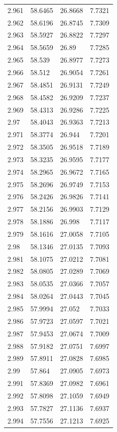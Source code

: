 \begin{tabular}{llll}
2.961 & 58.6465 & 26.8668 & 7.7321 \\
2.962 & 58.6196 & 26.8745 & 7.7309 \\
2.963 & 58.5927 & 26.8822 & 7.7297 \\
2.964 & 58.5659 & 26.89 & 7.7285 \\
2.965 & 58.539 & 26.8977 & 7.7273 \\
2.966 & 58.512 & 26.9054 & 7.7261 \\
2.967 & 58.4851 & 26.9131 & 7.7249 \\
2.968 & 58.4582 & 26.9209 & 7.7237 \\
2.969 & 58.4313 & 26.9286 & 7.7225 \\
2.97 & 58.4043 & 26.9363 & 7.7213 \\
2.971 & 58.3774 & 26.944 & 7.7201 \\
2.972 & 58.3505 & 26.9518 & 7.7189 \\
2.973 & 58.3235 & 26.9595 & 7.7177 \\
2.974 & 58.2965 & 26.9672 & 7.7165 \\
2.975 & 58.2696 & 26.9749 & 7.7153 \\
2.976 & 58.2426 & 26.9826 & 7.7141 \\
2.977 & 58.2156 & 26.9903 & 7.7129 \\
2.978 & 58.1886 & 26.998 & 7.7117 \\
2.979 & 58.1616 & 27.0058 & 7.7105 \\
2.98 & 58.1346 & 27.0135 & 7.7093 \\
2.981 & 58.1075 & 27.0212 & 7.7081 \\
2.982 & 58.0805 & 27.0289 & 7.7069 \\
2.983 & 58.0535 & 27.0366 & 7.7057 \\
2.984 & 58.0264 & 27.0443 & 7.7045 \\
2.985 & 57.9994 & 27.052 & 7.7033 \\
2.986 & 57.9723 & 27.0597 & 7.7021 \\
2.987 & 57.9453 & 27.0674 & 7.7009 \\
2.988 & 57.9182 & 27.0751 & 7.6997 \\
2.989 & 57.8911 & 27.0828 & 7.6985 \\
2.99 & 57.864 & 27.0905 & 7.6973 \\
2.991 & 57.8369 & 27.0982 & 7.6961 \\
2.992 & 57.8098 & 27.1059 & 7.6949 \\
2.993 & 57.7827 & 27.1136 & 7.6937 \\
2.994 & 57.7556 & 27.1213 & 7.6925 \\

\end{tabular}
